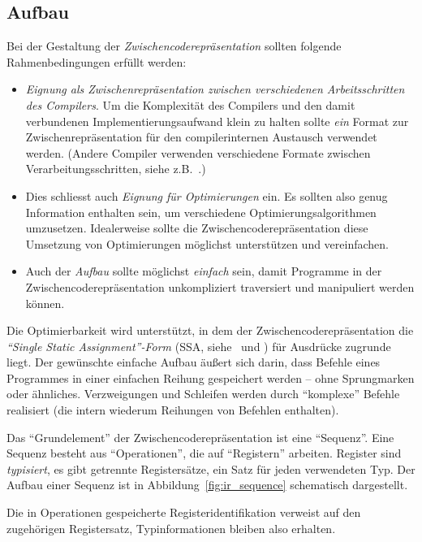 \documentclass[twoside,a4paper,fleqn,12pt]{book}
\begin{document}
\subsection{Aufbau}

Bei der Gestaltung der \emph{Zwischencoderepräsentation} sollten folgende Rahmenbedingungen erfüllt werden:
\begin{itemize}
\item \emph{Eignung als Zwischenrepräsentation zwischen verschiedenen Arbeitsschritten des Compilers}.
Um die Komplexität des Compilers und den damit verbundenen Implementierungsaufwand klein zu halten
sollte \emph{ein} Format zur Zwischenrepräsentation für den compilerinternen Austausch verwendet werden.
(Andere Compiler verwenden verschiedene Formate zwischen Verarbeitungsschritten, siehe z.B.~\cite{SIMPLE}.)
\item Dies schliesst auch \emph{Eignung für Optimierungen} ein. Es sollten also genug Information enthalten sein,
um verschiedene Optimierungsalgorithmen umzusetzen. Idealerweise sollte die Zwischencoderepräsentation
diese Umsetzung von Optimierungen möglichst unterstützen und vereinfachen.
\item Auch der \emph{Aufbau} sollte möglichst \emph{einfach} sein, damit Programme in der Zwischencoderepräsentation 
unkompliziert traversiert und manipuliert werden können.
\end{itemize}

Die Optimierbarkeit wird unterstützt, in dem der Zwischencoderepräsentation die \emph{``Single Static Assignment''-Form} (SSA, siehe~\cite{ssa1} und \cite{ssa2})
für Ausdrücke zugrunde liegt. Der gewünschte einfache Aufbau äußert sich darin, dass Befehle eines Programmes
in einer einfachen Reihung gespeichert werden -- ohne Sprungmarken oder ähnliches. Verzweigungen und Schleifen werden
durch "`komplexe"' Befehle realisiert (die intern wiederum Reihungen von Befehlen enthalten).

Das "`Grundelement"' der Zwischencoderepräsentation ist eine "`Sequenz"'. Eine Sequenz besteht aus "`Operationen"',
die auf "`Registern"' arbeiten. Register sind \emph{typisiert}, es gibt getrennte Registersätze, ein Satz für jeden verwendeten Typ. 
Der Aufbau einer Sequenz ist in Abbildung~\ref{fig:ir_sequence} schematisch dargestellt.

Die in Operationen gespeicherte Registeridentifikation verweist auf den zugehörigen Registersatz, Typinformationen bleiben also erhalten.
\end{document}
